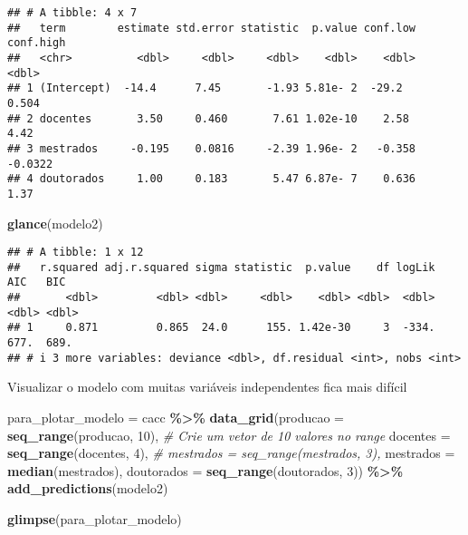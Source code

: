 \documentclass[
]{article}
\newenvironment{Shaded}{\begin{snugshade}}{\end{snugshade}}
\newcommand{\AttributeTok}[1]{\textcolor[rgb]{0.13,0.29,0.53}{#1}}
\newcommand{\CommentTok}[1]{\textcolor[rgb]{0.56,0.35,0.01}{\textit{#1}}}
\newcommand{\DecValTok}[1]{\textcolor[rgb]{0.00,0.00,0.81}{#1}}
\newcommand{\FunctionTok}[1]{\textcolor[rgb]{0.13,0.29,0.53}{\textbf{#1}}}
\newcommand{\NormalTok}[1]{#1}
\newcommand{\OtherTok}[1]{\textcolor[rgb]{0.56,0.35,0.01}{#1}}
\newcommand{\SpecialCharTok}[1]{\textcolor[rgb]{0.81,0.36,0.00}{\textbf{#1}}}
\begin{document}
\begin{verbatim}
## # A tibble: 4 x 7
##   term        estimate std.error statistic  p.value conf.low conf.high
##   <chr>          <dbl>     <dbl>     <dbl>    <dbl>    <dbl>     <dbl>
## 1 (Intercept)  -14.4      7.45       -1.93 5.81e- 2  -29.2      0.504 
## 2 docentes       3.50     0.460       7.61 1.02e-10    2.58     4.42  
## 3 mestrados     -0.195    0.0816     -2.39 1.96e- 2   -0.358   -0.0322
## 4 doutorados     1.00     0.183       5.47 6.87e- 7    0.636    1.37
\end{verbatim}

\begin{Shaded}
\begin{Highlighting}[]
\FunctionTok{glance}\NormalTok{(modelo2)}
\end{Highlighting}
\end{Shaded}

\begin{verbatim}
## # A tibble: 1 x 12
##   r.squared adj.r.squared sigma statistic  p.value    df logLik   AIC   BIC
##       <dbl>         <dbl> <dbl>     <dbl>    <dbl> <dbl>  <dbl> <dbl> <dbl>
## 1     0.871         0.865  24.0      155. 1.42e-30     3  -334.  677.  689.
## # i 3 more variables: deviance <dbl>, df.residual <int>, nobs <int>
\end{verbatim}

Visualizar o modelo com muitas variáveis independentes fica mais difícil

\begin{Shaded}
\begin{Highlighting}[]
\NormalTok{para\_plotar\_modelo }\OtherTok{=}\NormalTok{ cacc }\SpecialCharTok{\%\textgreater{}\%} 
  \FunctionTok{data\_grid}\NormalTok{(}\AttributeTok{producao =} \FunctionTok{seq\_range}\NormalTok{(producao, }\DecValTok{10}\NormalTok{), }\CommentTok{\# Crie um vetor de 10 valores no range}
            \AttributeTok{docentes =} \FunctionTok{seq\_range}\NormalTok{(docentes, }\DecValTok{4}\NormalTok{),  }
            \CommentTok{\# mestrados = seq\_range(mestrados, 3),}
            \AttributeTok{mestrados =} \FunctionTok{median}\NormalTok{(mestrados),}
            \AttributeTok{doutorados =} \FunctionTok{seq\_range}\NormalTok{(doutorados, }\DecValTok{3}\NormalTok{)) }\SpecialCharTok{\%\textgreater{}\%} 
  \FunctionTok{add\_predictions}\NormalTok{(modelo2)}

\FunctionTok{glimpse}\NormalTok{(para\_plotar\_modelo)}
\end{Highlighting}
\end{Shaded}
\end{document}
